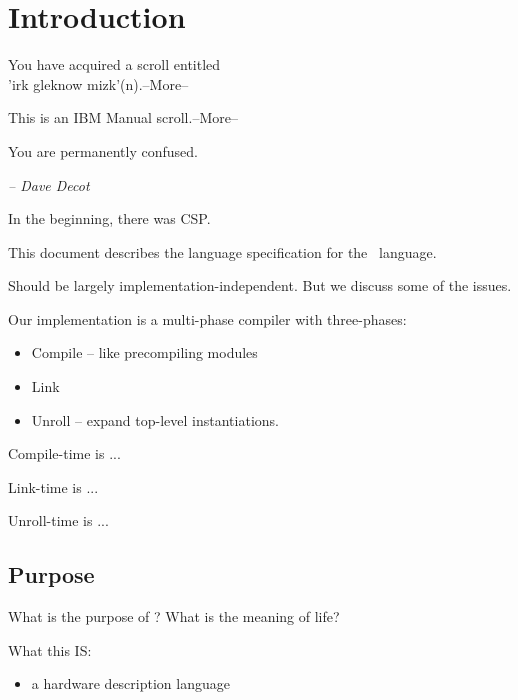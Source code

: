 
\chapter{Introduction}
\label{sec:intro}

\begin{flushright}
{ \ttfamily
You have acquired a scroll entitled\\
'irk gleknow mizk'(n).--More--

\medskip
This is an IBM Manual scroll.--More--

\medskip
You are permanently confused.

\bigskip
}	%
{\itshape -- Dave Decot}
\end{flushright}


In the beginning, there was CSP\cite{ref:csp}.

This document describes the language specification for the \artxx\ language.  

Should be largely implementation-independent.  
But we discuss some of the issues.  

Our implementation is a multi-phase compiler with three-phases:
\begin{itemize}
\item Compile -- like precompiling modules
\item Link
\item Unroll -- expand top-level instantiations.  
\end{itemize}

Compile-time is ...

Link-time is ...

Unroll-time is ...


\section{Purpose}
\label{sec:intro:purpose}

What is the purpose of \artxx?
What is the meaning of life?

What this IS:
\begin{itemize}
\item a hardware description language
\end{itemize}

